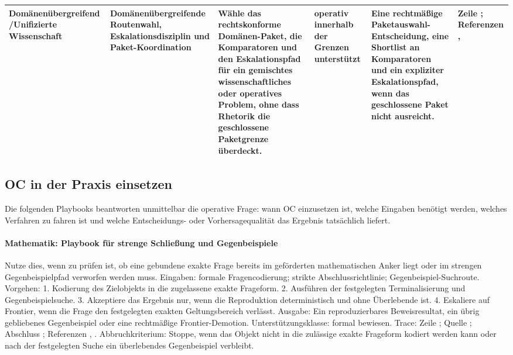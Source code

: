 \begin{longtable}{@{}L{0.11\textwidth}L{0.16\textwidth}L{0.19\textwidth}L{0.12\textwidth}L{0.18\textwidth}L{0.16\textwidth}@{}}
Domänenübergreifend /\allowbreak Unifizierte Wissenschaft & Domänenübergreifende Routenwahl, Eskalationsdisziplin und Paket-Koordination & Wähle das rechtskonforme Domänen-Paket, die Komparatoren und den Eskalationspfad für ein gemischtes wissenschaftliches oder operatives Problem, ohne dass Rhetorik die geschlossene Paketgrenze überdeckt. & operativ innerhalb der Grenzen unterstützt & Eine rechtmäßige Paketauswahl-Entscheidung, eine Shortlist an Komparatoren und ein expliziter Eskalationspfad, wenn das geschlossene Paket nicht ausreicht. & Zeile ; \allowbreak Referenzen , \allowbreak {} \\
\bottomrule
\end{longtable}
\endgroup

\subsection{OC in der Praxis einsetzen}
Die folgenden Playbooks beantworten unmittelbar die operative Frage: wann OC einzusetzen ist, welche Eingaben benötigt werden, welches Verfahren zu fahren ist und welche Entscheidungs- oder Vorhersagequalität das Ergebnis tatsächlich liefert.

\paragraph{Mathematik: Playbook für strenge Schließung und Gegenbeispiele}
Nutze dies, wenn zu prüfen ist, ob eine gebundene exakte Frage bereits im geförderten mathematischen Anker liegt oder im strengen Gegenbeispielpfad verworfen werden muss.
Eingaben: formale Fragencodierung; \allowbreak strikte Abschlussrichtlinie; \allowbreak Gegenbeispiel-Suchroute.
Vorgehen: 1. Kodierung des Zielobjekts in die zugelassene exakte Frageform. 2. Ausführen der festgelegten Terminalisierung und Gegenbeispielsuche. 3. Akzeptiere das Ergebnis nur, wenn die Reproduktion deterministisch und ohne Überlebende ist. 4. Eskaliere auf Frontier, wenn die Frage den festgelegten exakten Geltungsbereich verlässt.
Ausgabe: Ein reproduzierbares Beweisresultat, ein übrig gebliebenes Gegenbeispiel oder eine rechtmäßige Frontier-Demotion.
Unterstützungsklasse: formal bewiesen.
Trace: Zeile ; \allowbreak Quelle ; \allowbreak Abschluss ; \allowbreak Referenzen , \allowbreak {}.
Abbruchkriterium: Stoppe, wenn das Objekt nicht in die zulässige exakte Frageform kodiert werden kann oder nach der festgelegten Suche ein überlebendes Gegenbeispiel verbleibt.

